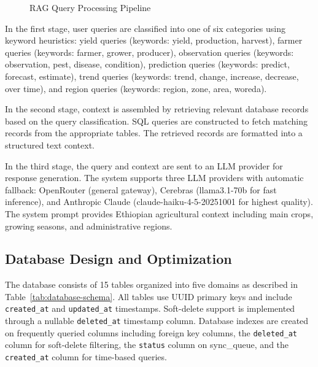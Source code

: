 \documentclass[12pt,a4paper,oneside]{report}
\begin{document}
\begin{figure}[H]
\centering
{}
\caption{RAG Query Processing Pipeline}
\label{fig:rag-pipeline}
\end{figure}

In the first stage, user queries are classified into one of six categories using keyword heuristics: yield queries (keywords: yield, production, harvest), farmer queries (keywords: farmer, grower, producer), observation queries (keywords: observation, pest, disease, condition), prediction queries (keywords: predict, forecast, estimate), trend queries (keywords: trend, change, increase, decrease, over time), and region queries (keywords: region, zone, area, woreda).

In the second stage, context is assembled by retrieving relevant database records based on the query classification. SQL queries are constructed to fetch matching records from the appropriate tables. The retrieved records are formatted into a structured text context.

In the third stage, the query and context are sent to an LLM provider for response generation. The system supports three LLM providers with automatic fallback: OpenRouter (general gateway), Cerebras (llama3.1-70b for fast inference), and Anthropic Claude (claude-haiku-4-5-20251001 for highest quality). The system prompt provides Ethiopian agricultural context including main crops, growing seasons, and administrative regions.

\subsection{Database Design and Optimization}
The database consists of 15 tables organized into five domains as described in Table~\ref{tab:database-schema}. All tables use UUID primary keys and include \texttt{created\_at} and \texttt{updated\_at} timestamps. Soft-delete support is implemented through a nullable \texttt{deleted\_at} timestamp column. Database indexes are created on frequently queried columns including foreign key columns, the \texttt{deleted\_at} column for soft-delete filtering, the \texttt{status} column on sync\_queue, and the \texttt{created\_at} column for time-based queries.
\end{document}
